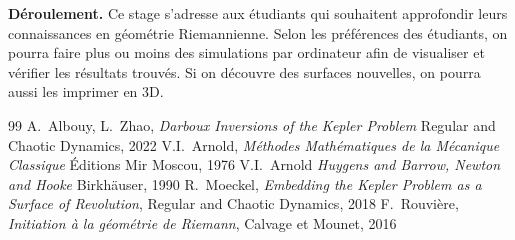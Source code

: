 \documentclass[a4paper,11pt]{article}
\begin{document}
{\bf Déroulement.}
Ce stage s'adresse aux étudiants qui souhaitent approfondir leurs connaissances
en géométrie Riemannienne.  Selon les préférences des étudiants, on pourra
faire plus ou moins des simulations par ordinateur afin de visualiser et
vérifier les résultats trouvés.  Si on découvre des surfaces
nouvelles, on pourra aussi les imprimer en 3D.


\vspace{-1.5em}
\renewcommand{\refname}{\normalsize Références}
%
\begin{thebibliography}{99}
\vspace{-1em}
{\footnotesize
{}
	A.~Albouy, L.~Zhao,
	{\it Darboux Inversions of the Kepler Problem}
	Regular and Chaotic Dynamics, 2022
	V.I.~Arnold,
	{\it Méthodes Mathématiques de la Mécanique Classique}
	Éditions Mir Moscou, 1976
	V.I.~Arnold
	{\it Huygens and Barrow, Newton and Hooke}
	Birkhäuser, 1990
	R.~Moeckel,
	{\it Embedding the Kepler Problem as a Surface of Revolution},
	Regular and Chaotic Dynamics, 2018
	F.~Rouvière,
	{\it Initiation à la géométrie de Riemann},
	Calvage et Mounet, 2016
}
\end{thebibliography}
\end{document}
